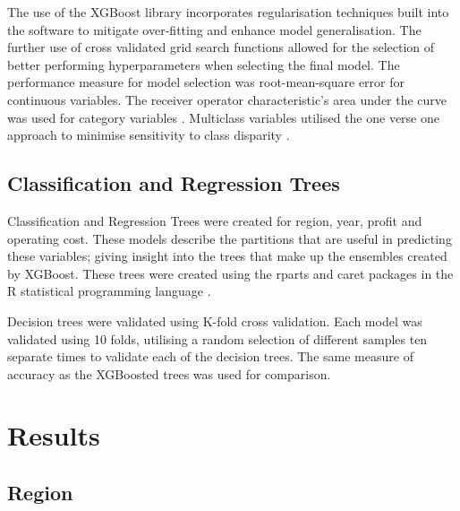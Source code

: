 \documentclass[review,12pt,authoryear]{elsarticle}
\begin{document}
\begin{linenumbers}
The use of the XGBoost library incorporates regularisation techniques built into the software to mitigate over-fitting and enhance model generalisation. The further use of cross validated grid search functions allowed for the selection of better performing hyperparameters when selecting the final model. The performance measure for model selection was root-mean-square error for continuous variables. The receiver operator characteristic's area under the curve was used for category variables \citep{hanley1982meaning}. Multiclass variables utilised the one verse one approach to minimise sensitivity to class disparity \citep{ferriExperimentalComparisonPerformance2009,handSimpleGeneralisationArea2001}.

\subsection{Classification and Regression Trees}

Classification and Regression Trees were created for region, year, profit and operating cost. These models describe the partitions that are useful in predicting these variables; giving insight into the trees that make up the ensembles created by XGBoost. These trees were created using the rparts and caret packages \citep{kuhnBuildingPredictiveModels2008,terrytherneauRpartRecursivePartitioning2022} in the R statistical programming language \citep{rcoreteamLanguageEnvironmentStatistical2021}.
\par
Decision trees were validated using K-fold cross validation. Each model was validated using 10 folds, utilising a random selection of different samples ten separate times to validate each of the decision trees. The same measure of accuracy as the XGBoosted trees was used for comparison.

\section{Results}


\subsection{Region}


\end{linenumbers}
\end{document}
